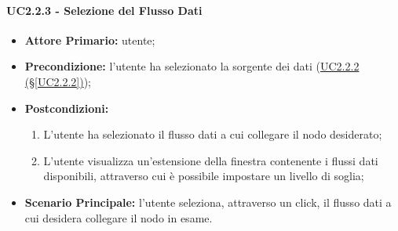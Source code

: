 \paragraph{UC2.2.3 - Selezione del Flusso Dati}\label{UC2.2.3}
\begin{itemize}
\item \textbf{Attore Primario:} utente;
\item \textbf{Precondizione:} l'utente ha selezionato la sorgente dei dati (\hyperref[UC2.2.2]{UC2.2.2 (§\ref*{UC2.2.2})});
\item \textbf{Postcondizioni:}
	\begin{enumerate}
	\item L'utente ha selezionato il flusso dati a cui collegare il nodo desiderato;
	\item L'utente visualizza un'estensione della finestra contenente i flussi dati disponibili, attraverso cui è 					possibile impostare un livello di soglia;
	\end{enumerate}
\item \textbf{Scenario Principale:} l'utente seleziona, attraverso un click, il flusso dati a cui desidera 						collegare il nodo in esame.
\end{itemize}

